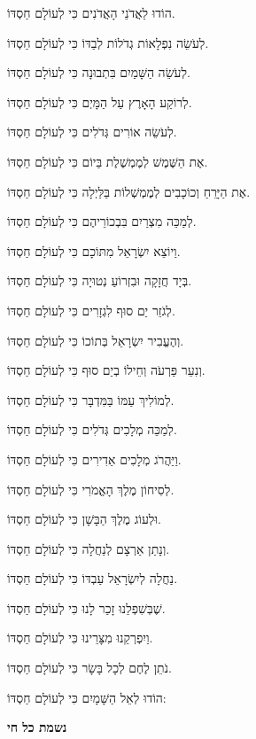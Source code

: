 {\glossfont
הוֹדוּ לַאֲדֹנֵי הָאֲדֹנִים \hfill כִּי לְעוֹלָם חַסְדּוֹ.

לְעֹשֵׂה נִפְלָאוֹת גְדֹלוֹת לְבַדּוֹ \hfill כִּי לְעוֹלָם חַסְדּוֹ.

לְעֹשֵׂה הַשָּׁמַיִם בִּתְבוּנָה \hfill כִּי לְעוֹלָם חַסְדּוֹ.

לְרוֹקַע הָאָרֶץ עַל הַמָּיְם \hfill כִּי לְעוֹלָם חַסְדּוֹ.

לְעֹשֵׂה אוֹרִים גְּדֹלִים \hfill כִּי לְעוֹלָם חַסְדּוֹ.

אֶת הַשֶּׁמֶשׁ לְמֶמְשֶׁלֶת בַּיוֹם \hfill כִּי לְעוֹלָם חַסְדּוֹ.

אֶת הַיָּרֵחַ וְכוֹכָבִים לְמֶמְשְׁלוֹת בַּלַּיְלָה \hfill כִּי לְעוֹלָם חַסְדּוֹ.

לְמַכֵּה מִצְרַיִם בִּבְכוֹרֵיהֶם \hfill כִּי לְעוֹלָם חַסְדּוֹ.

וַיוֹצֵא יִשְׂרָאֵל מִתּוֹכָם \hfill כִּי לְעוֹלָם חַסְדּוֹ.

בְּיָד חֲזָקָה וּבִזְרוֹעַ נְטוּיָה \hfill כִּי לְעוֹלָם חַסְדּוֹ.

לְגֹזֵר יַם סוּף לִגְזָרִים \hfill כִּי לְעוֹלָם חַסְדּוֹ.

וְהֶעֱבִיר יִשְׂרָאֵל בְּתוֹכוֹ \hfill כִּי לְעוֹלָם חַסְדּוֹ.

וְנִעֵר פַּרְעֹה וְחֵילוֹ בְיַם סוּף \hfill כִּי לְעוֹלָם חַסְדּוֹ.

לְמוֹלִיךְ עַמּוֹ בַּמִּדְבָּר \hfill כִּי לְעוֹלָם חַסְדּוֹ.

לְמַכֵּה מְלָכִים גְּדֹלִים \hfill כִּי לְעוֹלָם חַסְדּוֹ.

וַיַּהֲרֹג מְלָכִים אַדִירִים \hfill כִּי לְעוֹלָם חַסְדּוֹ.

לְסִיחוֹן מֶלֶךְ הָאֱמֹרִי \hfill כִּי לְעוֹלָם חַסְדּוֹ.

וּלְעוֹג מֶלֶךְ הַבָּשָׁן \hfill כִּי לְעוֹלָם חַסְדּוֹ.

וְנָתַן אַרְצָם לְנַחֲלָה \hfill כִּי לְעוֹלָם חַסְדּוֹ.

נַחֲלָה לְיִשְׂרָאֵל עַבְדּוֹ \hfill כִּי לְעוֹלָם חַסְדּוֹ.

שֶׁבְּשִׁפְלֵנוּ זָכַר לָנוּ \hfill כִּי לְעוֹלָם חַסְדּוֹ.

וַיִפְרְקֵנוּ מִצָּרֵינוּ \hfill כִּי לְעוֹלָם חַסְדּוֹ.

נֹתֵן לֶחֶם לְכָל בָּשָׂר \hfill כִּי לְעוֹלָם חַסְדּוֹ.

הוֹדוּ לְאֵל הַשָּׁמָיִם \hfill כִּי לְעוֹלָם חַסְדּוֹ:

}

\begin{center}
{\large \bfseries \textcolor{light-gray}{
נשמת כל חי
}}
\end{center}

